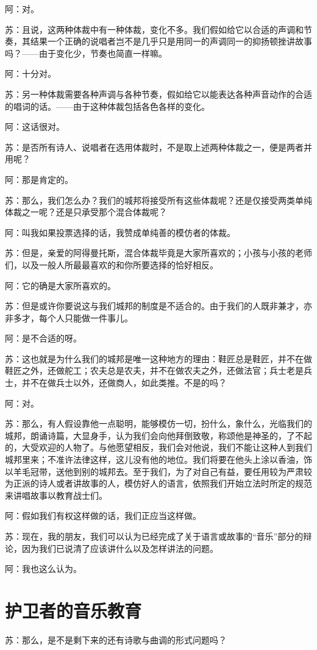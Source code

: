 \documentclass[11pt,oneside]{book}
\begin{document}
\begin{common-format}
阿：对。

苏：且说，这两种体裁中有一种体裁，变化不多。我们假如给它以合适的声调和节奏，其结果一个正确的说唱者岂不是几乎只是用同一的声调同一的抑扬顿挫讲故事吗？——由于变化少，节奏也简直一样嘛。

阿：十分对。

苏：另一种体裁需要各种声调与各种节奏，假如给它以能表达各种声音动作的合适的唱词的话。——由于这种体裁包括各色各样的变化。

阿：这话很对。

苏：是否所有诗人、说唱者在选用体裁时，不是取上述两种体裁之一，便是两者并用呢？

阿：那是肯定的。

苏：那么，我们怎么办？我们的城邦将接受所有这些体裁呢？还是仅接受两类单纯体裁之一呢？还是只承受那个混合体裁呢？

阿：叫我如果投票选择的话，我赞成单纯善的模仿者的体裁。

苏：但是，亲爱的阿得曼托斯，混合体裁毕竟是大家所喜欢的；小孩与小孩的老师们，以及一般人所最最喜欢的和你所要选择的恰好相反。

阿：它的确是大家所喜欢的。

苏：但是或许你要说这与我们城邦的制度是不适合的。由于我们的人既非兼才，亦非多才，每个人只能做一件事儿。

阿：是不合适的呀。

苏：这也就是为什么我们的城邦是唯一这种地方的理由：鞋匠总是鞋匠，并不在做鞋匠之外，还做舵工；农夫总是农夫，并不在做农夫之外，还做法官；兵士老是兵士，并不在做兵士以外，还做商人，如此类推。不是的吗？

阿：对。

苏：那么，有人假设靠他一点聪明，能够模仿一切，扮什么，象什么，光临我们的城邦，朗诵诗篇，大显身手，认为我们会向他拜倒致敬，称颂他是神圣的，了不起的，大受欢迎的人物了。与他愿望相反，我们会对他说，我们不能让这种人到我们城邦里来；不准许法律这样，这儿没有他的地位。我们将要在他头上涂以香油，饰以羊毛冠带，送他到别的城邦去。至于我们，为了对自己有益，要任用较为严肃较为正派的诗人或者讲故事的人，模仿好人的语言，依照我们开始立法时所定的规范来讲唱故事以教育战士们。

阿：假如我们有权这样做的话，我们正应当这样做。

苏：现在，我的朋友，我们可以认为已经完成了关于语言或故事的“音乐”部分的辩论，因为我们已说清了应该讲什么以及怎样讲法的问题。

阿：我也这么认为。


\section{护卫者的音乐教育}
苏：那么，是不是剩下来的还有诗歌与曲调的形式问题吗？


\end{common-format}
\end{document}
